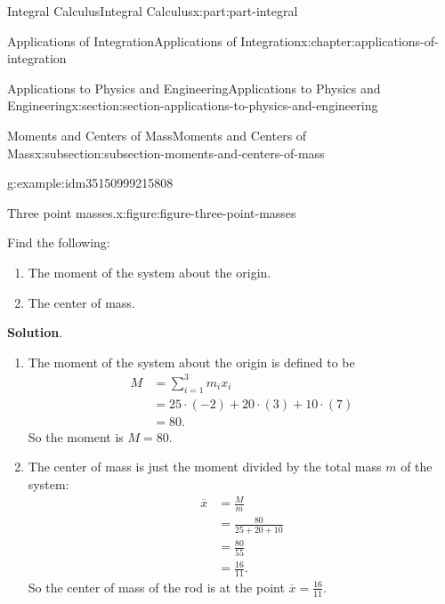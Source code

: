 \documentclass[twoside,10pt,]{tufte-book}
\newcommand{\blocktitlefont}{\relax}
\numberwithin{equation}{part}
\newcommand{\amp}{&}
\begin{document}
\begin{partptx}{Integral Calculus}{}{Integral Calculus}{}{}{x:part:part-integral}
\begin{chapterptx}{Applications of Integration}{}{Applications of Integration}{}{}{x:chapter:applications-of-integration}
\begin{sectionptx}{Applications to Physics and Engineering}{}{Applications to Physics and Engineering}{}{}{x:section:section-applications-to-physics-and-engineering}
\begin{subsectionptx}{Moments and Centers of Mass}{}{Moments and Centers of Mass}{}{}{x:subsection:subsection-moments-and-centers-of-mass}
\begin{example}{}{g:example:idm35150999215808}
\begin{figureptx}{Three point masses.}{x:figure:figure-three-point-masses}{}%
\begin{image}{0}{1}{0}%
%
\end{image}%
\tcblower
\end{figureptx}%
Find the following:%
\begin{enumerate}
\item{}The moment of the system about the origin.%
\item{}The center of mass.%
\end{enumerate}
%
\par\smallskip%
\noindent\textbf{\blocktitlefont Solution}.\hypertarget{g:solution:idm35150999212224}{}\quad{}%
\begin{enumerate}
\item{}The moment of the system about the origin is defined to be%
\begin{align*}
M \amp= \sum_{i=1}^{3}m_{i}x_{i}\\
\amp= 25\cdot(-2)+20\cdot(3)+10\cdot(7)\\
\amp= 80.
\end{align*}
So the moment is \(M = 80\).%
\item{}The center of mass is just the moment divided by the total mass \(m\) of the system:%
\begin{align*}
\overline{x}\amp= \frac{M}{m}\\
\amp= \frac{80}{25+20+10}\\
\amp= \frac{80}{55}\\
\amp= \frac{16}{11}.
\end{align*}
So the center of mass of the rod is at the point \(\overline{x} = \frac{16}{11}\).%
\end{enumerate}
\end{example}

\end{subsectionptx}
\end{sectionptx}
\end{chapterptx}
\end{partptx}
\end{document}
